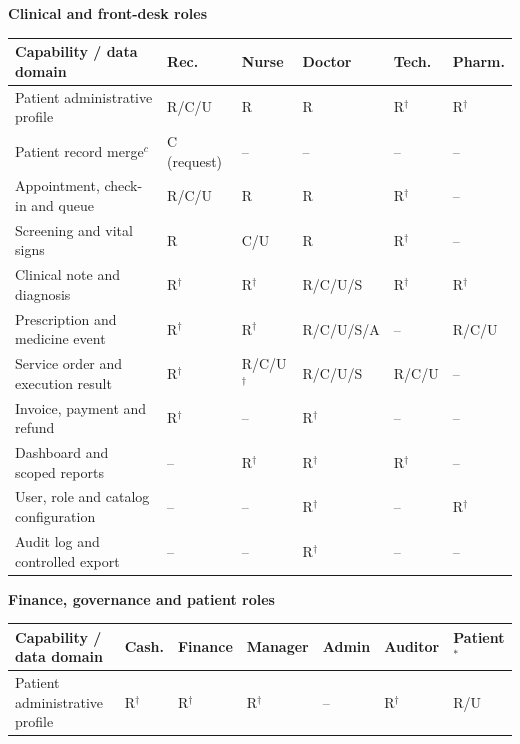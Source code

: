 \documentclass[a4paper,12pt]{article}
\begin{document}
\begin{table}[p]
\centering
\scriptsize
\setlength{\tabcolsep}{3pt}
\renewcommand{\arraystretch}{1.16}
\textbf{Clinical and front-desk roles}\par\vspace{0.15cm}
\begin{tabular}{@{}p{}*{5}{>{\centering\arraybackslash}p{}}@{}}
\toprule
Capability / data domain & Rec. & Nurse & Doctor & Tech. & Pharm. \\
\midrule
Patient administrative profile & R/C/U & R & R & R$^{\dagger}$ & R$^{\dagger}$ \\
Patient record merge$^{c}$ & C (request) & -- & -- & -- & -- \\
Appointment, check-in and queue & R/C/U & R & R & R$^{\dagger}$ & -- \\
Screening and vital signs & R & C/U & R & R$^{\dagger}$ & -- \\
Clinical note and diagnosis & R$^{\dagger}$ & R$^{\dagger}$ & R/C/U/S & R$^{\dagger}$ & R$^{\dagger}$ \\
Prescription and medicine event & R$^{\dagger}$ & R$^{\dagger}$ & R/C/U/S/A & -- & R/C/U \\
Service order and execution result & R$^{\dagger}$ & R/C/U$^{\dagger}$ & R/C/U/S & R/C/U & -- \\
Invoice, payment and refund & R$^{\dagger}$ & -- & R$^{\dagger}$ & -- & -- \\
Dashboard and scoped reports & -- & R$^{\dagger}$ & R$^{\dagger}$ & R$^{\dagger}$ & -- \\
User, role and catalog configuration & -- & -- & R$^{\dagger}$ & -- & R$^{\dagger}$ \\
Audit log and controlled export & -- & -- & R$^{\dagger}$ & -- & -- \\
\bottomrule
\end{tabular}
\par\vspace{0.35cm}
\textbf{Finance, governance and patient roles}\par\vspace{0.15cm}
\begin{tabular}{@{}p{}*{6}{>{\centering\arraybackslash}p{}}@{}}
\toprule
Capability / data domain & Cash. & Finance & Manager & Admin & Auditor & Patient$^{*}$ \\
\midrule
Patient administrative profile & R$^{\dagger}$ & R$^{\dagger}$ & R$^{\dagger}$ & -- & R$^{\dagger}$ & R/U \\

\end{tabular}
\end{table}
\end{document}
